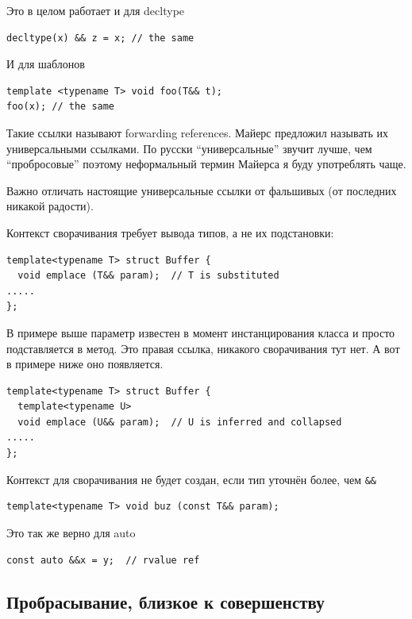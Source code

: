 \documentclass[a4paper,12pt,oneside]{book}
\begin{document}
Это в целом работает и для decltype

\begin{lstlisting}
decltype(x) && z = x; // the same
\end{lstlisting}

И для шаблонов

\begin{lstlisting}
template <typename T> void foo(T&& t);
foo(x); // the same
\end{lstlisting}

Такие ссылки называют forwarding references. Майерс \cite{effmoderncpp} предложил называть их универсальными ссылками. По русски ``универсальные'' звучит лучше, чем ``пробросовые'' поэтому неформальный термин Майерса я буду употреблять чаще.

Важно отличать настоящие универсальные ссылки от фальшивых (от последних никакой радости).

Контекст сворачивания требует вывода типов, а не их подстановки:

\begin{lstlisting}
template<typename T> struct Buffer {
  void emplace (T&& param);  // T is substituted
.....
};
\end{lstlisting}

В примере выше параметр известен в момент инстанцирования класса и просто подставляется в метод. Это правая ссылка, никакого сворачивания тут нет. А вот в примере ниже оно появляется.

\begin{lstlisting}
template<typename T> struct Buffer {
  template<typename U>
  void emplace (U&& param);  // U is inferred and collapsed
.....
};
\end{lstlisting}

Контекст для сворачивания не будет создан, если тип уточнён более, чем \lstinline!&&!

\begin{lstlisting}
template<typename T> void buz (const T&& param); 
\end{lstlisting}

Это так же верно для auto

\begin{lstlisting}
const auto &&x = y;  // rvalue ref 
\end{lstlisting}

\subsection{Пробрасывание, близкое к совершенству}\label{PerfectForw}
\end{document}
